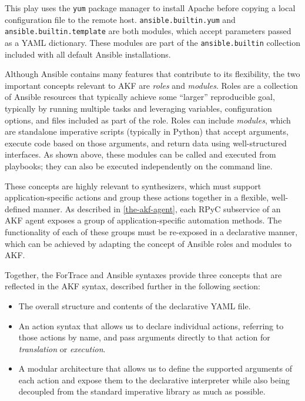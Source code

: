 \documentclass[letterpaper,12pt]{report}
\def\tightlist{}
\newcommand{\passthrough}[1]{#1}
\begin{document}
This play uses the \passthrough{\lstinline!yum!} package manager to
install Apache before copying a local configuration file to the remote
host. \passthrough{\lstinline!ansible.builtin.yum!} and
\passthrough{\lstinline!ansible.builtin.template!} are both modules,
which accept parameters passed as a YAML dictionary. These modules are
part of the \passthrough{\lstinline!ansible.builtin!} collection
included with all default Ansible installations.

Although Ansible contains many features that contribute to its
flexibility, the two important concepts relevant to AKF are \emph{roles}
and \emph{modules}. Roles are a collection of Ansible resources that
typically achieve some ``larger'' reproducible goal, typically by
running multiple tasks and leveraging variables, configuration options,
and files included as part of the role. Roles can include
\emph{modules}, which are standalone imperative scripts (typically in
Python) that accept arguments, execute code based on those arguments,
and return data using well-structured interfaces. As shown above, these
modules can be called and executed from playbooks; they can also be
executed independently on the command line.

These concepts are highly relevant to synthesizers, which must support
application-specific actions and group these actions together in a
flexible, well-defined manner. As described in \autoref{the-akf-agent}, each RPyC subservice of an AKF agent
exposes a group of application-specific automation methods. The
functionality of each of these groups must be re-exposed in a
declarative manner, which can be achieved by adapting the concept of
Ansible roles and modules to AKF.

Together, the ForTrace and Ansible syntaxes provide three concepts that
are reflected in the AKF syntax, described further in the following
section:

\begin{itemize}
\tightlist
\item
  The overall structure and contents of the declarative YAML file.
\item
  An action syntax that allows us to declare individual actions,
  referring to those actions by name, and pass arguments directly to
  that action for \emph{translation} or \emph{execution}.
\item
  A modular architecture that allows us to define the supported
  arguments of each action and expose them to the declarative
  interpreter while also being decoupled from the standard imperative
  library as much as possible.
\end{itemize}
\end{document}
